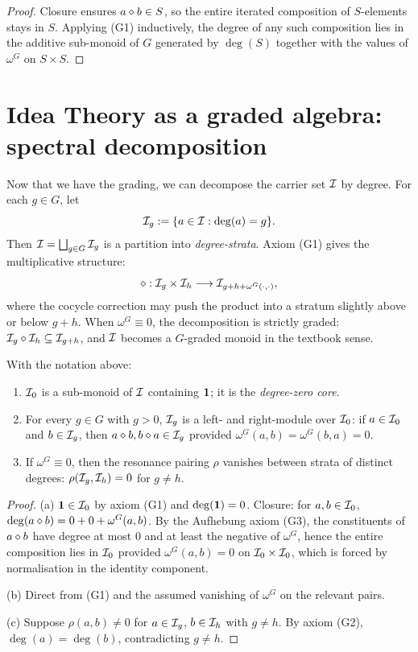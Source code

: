 \begin{proof}
Closure ensures $a\mathbin{\diamond} b\in S$, so the entire iterated composition
of $S$-elements stays in $S$. Applying (G1) inductively, the degree of
any such composition lies in the additive sub-monoid of $G$ generated
by $\deg(S)$ together with the values of $\omega^G$ on $S\times S$.
\end{proof}

\section{Idea Theory as a graded algebra: spectral decomposition}
\label{sec:spectral}

Now that we have the grading, we can decompose the carrier set
$\mathcal{I}$ by degree. For each $g\in G$, let
\[
  \mathcal{I}_g \mathrel{:=} \{a \in \mathcal{I} : \deg(a) = g\}.
\]
Then $\mathcal{I} = \bigsqcup_{g\in G}\mathcal{I}_g$ is a partition into
\emph{degree-strata}. Axiom (G1) gives the multiplicative structure:
\[
  \mathbin{\diamond} : \mathcal{I}_g \times \mathcal{I}_h \longrightarrow \mathcal{I}_{g+h+
    \omega^G(\cdot,\cdot)},
\]
where the cocycle correction may push the product into a stratum
slightly above or below $g+h$. When $\omega^G\equiv 0$, the
decomposition is strictly graded: $\mathcal{I}_g\mathbin{\diamond} \mathcal{I}_h \subseteq
\mathcal{I}_{g+h}$, and $\mathcal{I}$ becomes a $G$-graded monoid in the textbook
sense.

\begin{proposition}\label{prop:spectral}
With the notation above:
\begin{enumerate}
\item[(a)] $\mathcal{I}_0$ is a sub-monoid of $\mathcal{I}$ containing $\mathbf{1}$;
  it is the \emph{degree-zero core}.
\item[(b)] For every $g\in G$ with $g>0$, $\mathcal{I}_g$ is a left- and
  right-module over $\mathcal{I}_0$: if $a\in\mathcal{I}_0$ and $b\in\mathcal{I}_g$,
  then $a\mathbin{\diamond} b, b\mathbin{\diamond} a\in \mathcal{I}_g$ provided $\omega^G(a,b)
  = \omega^G(b,a) = 0$.
\item[(c)] If $\omega^G \equiv 0$, then the resonance pairing $\rho$
  vanishes between strata of distinct degrees: $\rho(\mathcal{I}_g,
  \mathcal{I}_h) = 0$ for $g\neq h$.
\end{enumerate}
\end{proposition}

\begin{proof}
(a) $\mathbf{1}\in\mathcal{I}_0$ by axiom (G1) and $\deg(\mathbf{1})=0$. Closure: for
$a,b\in\mathcal{I}_0$, $\deg(a\mathbin{\diamond} b) = 0 + 0 + \omega^G(a,b)$. By the
Aufhebung axiom (G3), the constituents of $a\mathbin{\diamond} b$ have degree at
most $0$ and at least the negative of $\omega^G$, hence the entire
composition lies in $\mathcal{I}_0$ provided $\omega^G(a,b) = 0$ on
$\mathcal{I}_0\times\mathcal{I}_0$, which is forced by normalisation in the
identity component.

(b) Direct from (G1) and the assumed vanishing of $\omega^G$ on the
relevant pairs.

(c) Suppose $\rho(a,b)\neq 0$ for $a\in\mathcal{I}_g$, $b\in\mathcal{I}_h$ with
$g\neq h$. By axiom (G2), $\deg(a) = \deg(b)$, contradicting $g\neq h$.
\end{proof}

